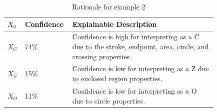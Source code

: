 \documentclass[conference]{IEEEtran}
\begin{document}
\begin{table}
    \caption{Prob. voting, effectiveness, and explainability for example 2}
    \centering
    \label{table:example2}
\end{table}

\begin{table}
    \caption{Rationale for example 2}
    \centering
    \begin{tabular}{| p{0.04\linewidth} | p{0.14\linewidth} | p{0.65\linewidth} |}
    \hline
     $X_d$ & Confidence & Explainable Description \\
    \hline \cline{1-3}
    $X_C$ & 74\% & Confidence is high for interpreting as a C due to the stroke, endpoint, area, circle, and crossing properties. \\ 
    \hline
    $X_Z$ & 15\% & Confidence is low for interpreting as a Z due to enclosed region properties. \\
    \hline
    $X_O$ & 11\% & Confidence is low for interpreting as a O due to circle properties. \\
    \hline
    \end{tabular}
    \label{table:exexample2}
\end{table}
\end{document}
